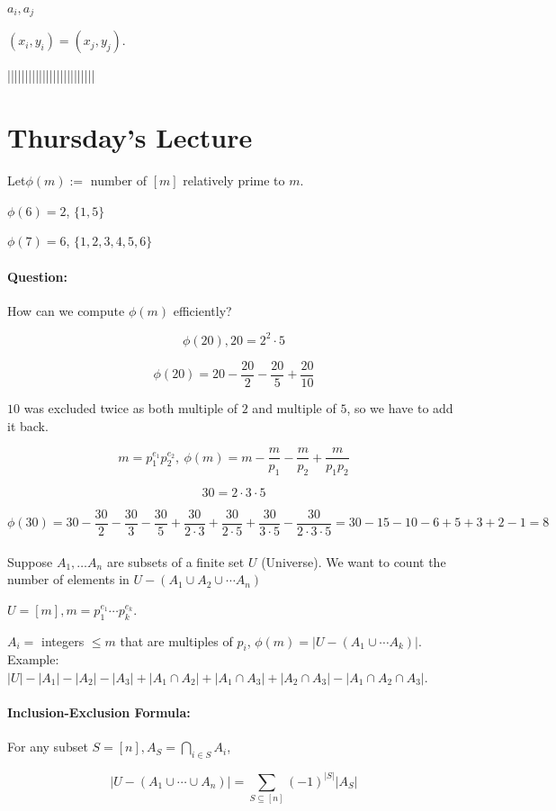 \documentclass[a4paper, 11pt, twoside]{article}
\begin{document}
$a_i, a_j$

$(x_i, y_i)=(x_j, y_j)$.

|||||||||||||||||||||||||

\section{Thursday's Lecture}

Let$\phi(m):=$ number of $[m]$ relatively prime to $m$.

$\phi(6)=2$, $\{1,5\}$

$\phi(7)=6$, $\{1,2,3,4,5,6\}$

\paragraph{Question:} How can we compute $\phi(m)$ efficiently?

\[\phi(20), 20 = 2^2\cdot 5\]

\[\phi(20)=20-\frac{20}{2}-\frac{20}{5}+\frac{20}{10}\]

$10$ was excluded twice as both multiple of $2$ and multiple of $5$, so we have to add it back.

\[m=p_1^{e_1}p_2^{e_2},\ \phi(m)=m-\frac{m}{p_1}-\frac{m}{p_2}+\frac{m}{p_1p_2}\]

\[30=2\cdot 3\cdot 5\]

\[\phi(30)=30-\frac{30}{2}-\frac{30}{3}-\frac{30}{5}+\frac{30}{2\cdot 3} + \frac{30}{2\cdot 5} + \frac{30}{3\cdot 5} - \frac{30}{2\cdot 3\cdot 5}=30-15-10-6+5+3+2-1=8\]\\

Suppose $A_1,\dots A_n$ are subsets of a finite set $U$ (Universe). We want to count the number of elements in $U-(A_1\cup A_2\cup \cdots A_n)$

$U=[m], m =p_1^{e_1}\cdots p_k^{e_k}$.

$A_i=$ integers $\leq m$ that are multiples of $p_i$, $\phi(m)=|U-(A_1\cup \cdots A_k)|$.\\

Example: $|U|-|A_1|-|A_2|-|A_3|+|A_1\cap A_2|+|A_1\cap A_3|+|A_2\cap A_3|-|A_1\cap A_2\cap A_3|$.

\paragraph{Inclusion-Exclusion Formula:} For any subset $S=[n], A_S=\bigcap_{i\in S}A_i$,

\[|U-(A_1\cup\cdots \cup A_n)|=\sum_{S\subseteq [n]}(-1)^{|S|}|A_S|\]
\end{document}
